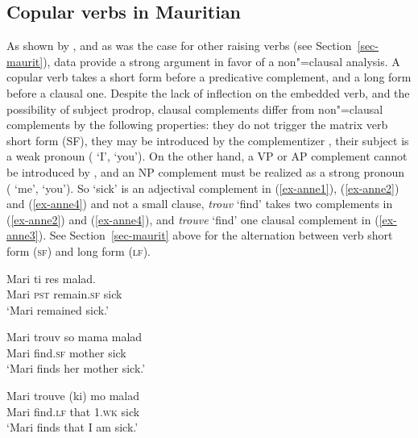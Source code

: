 \subsection{Copular verbs in Mauritian}

As shown by \citet{HenriandLaurens2011}, and as was the case for other raising verbs (see Section~\ref{sec-maurit}),  data
provide a strong argument in favor of a non"=clausal analysis.
A copular verb takes a short form before a
predicative complement, and
a long form before a clausal one. Despite the lack of inflection on the embedded verb, and the
possibility of subject prodrop, clausal complements differ from non"=clausal complements by the
following properties: they do not trigger the matrix verb short form (SF), they may be introduced by
the complementizer , their subject is a weak pronoun ( `I',  `you'). On
the other hand, a VP or AP complement cannot be introduced by , and an NP complement must
be realized as a strong pronoun
( `me',  `you'). So  `sick' is an adjectival complement in
(\ref{ex-anne1}), (\ref{ex-anne2}) and (\ref{ex-anne4}) and not a small clause, \emph{trouv} `find' takes
two complements in (\ref{ex-anne2}) and (\ref{ex-anne4}), and \emph{trouve} `find' one clausal complement in (\ref{ex-anne3}). See Section~\ref{sec-maurit}
above for the alternation between verb short form (\textsc{sf}) and long form (\textsc{lf}).

\eal
\ex 
\gll Mari ti res  malad.\\
     Mari \textsc{pst} remain.\textsc{sf} sick\\\hfill\citep[]{HenriandLaurens2011}
\glt `Mari remained sick.' \label{ex-anne1}

\ex 
\gll Mari trouv  so mama malad\\
     Mari find.\textsc{sf} \POSS{} mother sick\\
\glt `Mari finds her mother sick.' \label{ex-anne2}

\ex 
\gll Mari trouve (ki) mo malad\\
     Mari find.\textsc{lf} \hphantom{(}that 1\SG.\textsc{wk} sick\\
\glt `Mari finds that I am sick.' \label{ex-anne3}

